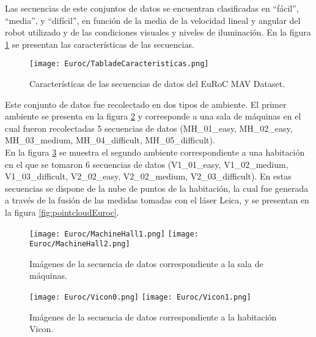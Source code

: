 {Las secuencias de este conjuntos de datos se encuentran clasificadas en ``fácil'', ``media'', y ``difícil'',  en función de la media de la velocidad lineal y angular del robot utilizado y de las condiciones visuales y niveles de iluminación. En la figura \ref{fig:tablaDeCaracteristicas} se presentan las características de las secuencias. 

\begin{figure}[H]
	\centering
	\texttt{[image: Euroc/TabladeCaracteristicas.png]}
	\caption[Características de las secuencias de datos del EuRoC MAV Dataset]{Características de las secuencias de datos del EuRoC MAV Dataset.}
	\label{fig:tablaDeCaracteristicas}
\end{figure}



Este conjunto de datos fue recolectado en dos tipos de ambiente. El primer ambiente se presenta en la figura \ref{fig:machineHall} y  corresponde a una sala de máquinas en el cual fueron recolectadas 5 secuencias de datos (MH\_01\_easy, MH\_02\_easy, MH\_03\_medium, MH\_04\_difficult, MH\_05\_difficult). \\

En la figura \ref{fig:vicon} se muestra el segundo ambiente correspondiente a una habitación en el que se tomaron 6 secuencias de datos (V1\_01\_easy, V1\_02\_medium, V1\_03\_difficult, V2\_02\_easy, V2\_02\_medium, V2\_03\_difficult). En estas secuencias se dispone de la nube de puntos de la habitación, la cual fue generada a través de la fusión de las medidas tomadas con el láser Leica, y se presentan en la figura \ref{fig:pointcloudEuroc}.\\

\begin{figure}[H]
	\centering
	\texttt{[image: Euroc/MachineHall1.png]}
	\texttt{[image: Euroc/MachineHall2.png]}
	\caption[Imágenes de la secuencia de datos correspondiente a la sala de máquinas]{Imágenes de la secuencia de datos correspondiente a la sala de máquinas.}
	\label{fig:machineHall}
\end{figure}


\begin{figure}[H]
	\centering
	\texttt{[image: Euroc/Vicon0.png]}
	\texttt{[image: Euroc/Vicon1.png]}
	\caption[Imágenes de la secuencia de datos correspondiente a la habitación Vicon]{Imágenes de la secuencia de datos correspondiente a la habitación Vicon.}
	\label{fig:vicon}
\end{figure}


}
